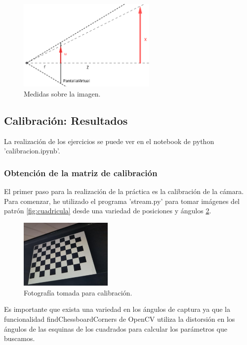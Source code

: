 \documentclass[12pt]{article}
\begin{document}
\begin{figure}[H]
    \centering
    \includegraphics[width=0.6\textwidth]{images_calibracion/Tales.png}  
    \caption{Medidas sobre la imagen.}
    \label{fig:Tales}
\end{figure}

\subsection{Calibración: Resultados}

La realización de los ejercicios se puede ver en el notebook de python 'calibracion.ipynb'. 

\subsubsection{Obtención de la matriz de calibración}

El primer paso para la realización de la práctica es la calibración de la cámara. 
Para comenzar, he utilizado el programa 'stream.py' para tomar imágenes del patrón \ref{fig:cuadricula} desde una variedad de posiciones y ángulos \ref{fig:calibracion}. 
\begin{figure}[H]
    \centering
    \includegraphics[width=0.4\textwidth]{images_calibracion/Calibracion.png}
    \caption{Fotografía tomada para calibración.}
    \label{fig:calibracion}
\end{figure}
Es importante que exista una variedad en los ángulos de captura ya que la funcionalidad findChessboardCorners de OpenCV utiliza la distorsión en los ángulos de las esquinas de los cuadrados para calcular los parámetros que buscamos.
\end{document}
